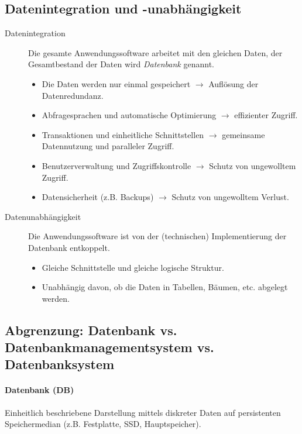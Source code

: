         \subsection{Datenintegration und -unabhängigkeit} %
            \begin{description}
            	\item[Datenintegration] Die gesamte Anwendungssoftware arbeitet mit den gleichen Daten, der Gesamtbestand der Daten wird \textit{Datenbank} genannt.
	            	\begin{itemize}
	            		\item Die Daten werden nur einmal gespeichert \(\rightarrow\) Auflösung der Datenredundanz.
	            		\item Abfragesprachen und automatische Optimierung \(\rightarrow\) effizienter Zugriff.
	            		\item Transaktionen und einheitliche Schnittstellen \(\rightarrow\) gemeinsame Datennutzung und paralleler Zugriff.
	            		\item Benutzerverwaltung und Zugriffskontrolle \(\rightarrow\) Schutz von ungewolltem Zugriff.
	            		\item Datensicherheit (z.B. Backups) \(\rightarrow\) Schutz von ungewolltem Verlust.
	            	\end{itemize}
	            \item[Datenunabhängigkeit] Die Anwendungssoftware ist von der (technischen) Implementierung der Datenbank entkoppelt.
		            \begin{itemize}
		            	\item Gleiche Schnittstelle und gleiche logische Struktur.
		            	\item Unabhängig davon, ob die Daten in Tabellen, Bäumen, etc. abgelegt werden.
		            \end{itemize}
        	\end{description}

        \subsection{Abgrenzung: Datenbank vs. Datenbankmanagementsystem vs. Datenbanksystem} %
            \paragraph{Datenbank (DB)}
                Einheitlich beschriebene Darstellung mittels diskreter Daten auf persistenten Speichermedian (z.B. Festplatte, SSD, Hauptspeicher).
            

